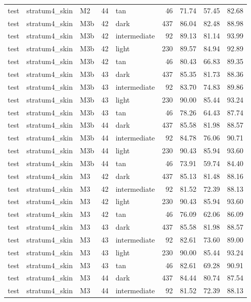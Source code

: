 \begin{tabular}{lllrlrrrr}
test & stratum4\_skin & M2 & 44 & tan & 46 & 71.74 & 57.45 & 82.68 \\
test & stratum4\_skin & M3b & 42 & dark & 437 & 86.04 & 82.48 & 88.98 \\
test & stratum4\_skin & M3b & 42 & intermediate & 92 & 89.13 & 81.14 & 93.99 \\
test & stratum4\_skin & M3b & 42 & light & 230 & 89.57 & 84.94 & 92.89 \\
test & stratum4\_skin & M3b & 42 & tan & 46 & 80.43 & 66.83 & 89.35 \\
test & stratum4\_skin & M3b & 43 & dark & 437 & 85.35 & 81.73 & 88.36 \\
test & stratum4\_skin & M3b & 43 & intermediate & 92 & 83.70 & 74.83 & 89.86 \\
test & stratum4\_skin & M3b & 43 & light & 230 & 90.00 & 85.44 & 93.24 \\
test & stratum4\_skin & M3b & 43 & tan & 46 & 78.26 & 64.43 & 87.74 \\
test & stratum4\_skin & M3b & 44 & dark & 437 & 85.58 & 81.98 & 88.57 \\
test & stratum4\_skin & M3b & 44 & intermediate & 92 & 84.78 & 76.06 & 90.71 \\
test & stratum4\_skin & M3b & 44 & light & 230 & 90.43 & 85.94 & 93.60 \\
test & stratum4\_skin & M3b & 44 & tan & 46 & 73.91 & 59.74 & 84.40 \\
test & stratum4\_skin & M3 & 42 & dark & 437 & 85.13 & 81.48 & 88.16 \\
test & stratum4\_skin & M3 & 42 & intermediate & 92 & 81.52 & 72.39 & 88.13 \\
test & stratum4\_skin & M3 & 42 & light & 230 & 90.43 & 85.94 & 93.60 \\
test & stratum4\_skin & M3 & 42 & tan & 46 & 76.09 & 62.06 & 86.09 \\
test & stratum4\_skin & M3 & 43 & dark & 437 & 85.58 & 81.98 & 88.57 \\
test & stratum4\_skin & M3 & 43 & intermediate & 92 & 82.61 & 73.60 & 89.00 \\
test & stratum4\_skin & M3 & 43 & light & 230 & 90.00 & 85.44 & 93.24 \\
test & stratum4\_skin & M3 & 43 & tan & 46 & 82.61 & 69.28 & 90.91 \\
test & stratum4\_skin & M3 & 44 & dark & 437 & 84.44 & 80.74 & 87.54 \\
test & stratum4\_skin & M3 & 44 & intermediate & 92 & 81.52 & 72.39 & 88.13 \\

\end{tabular}
